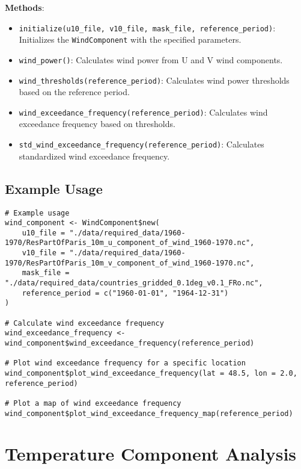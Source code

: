 \documentclass[a4paper,12pt]{article}
\begin{document}
\textbf{Methods}:

\begin{itemize}
    \item \texttt{initialize(u10\_file, v10\_file, mask\_file, reference\_period)}: Initializes the \texttt{WindComponent} with the specified parameters.
        
    \item \texttt{wind\_power()}: Calculates wind power from U and V wind components.
    
    \item \texttt{wind\_thresholds(reference\_period)}: Calculates wind power thresholds based on the reference period.
    
    \item \texttt{wind\_exceedance\_frequency(reference\_period)}: Calculates wind exceedance frequency based on thresholds.
    
    \item \texttt{std\_wind\_exceedance\_frequency(reference\_period)}: Calculates standardized wind exceedance frequency.
\end{itemize}

\subsection{Example Usage}

\begin{verbatim}
# Example usage
wind_component <- WindComponent$new(
    u10_file = "./data/required_data/1960-1970/ResPartOfParis_10m_u_component_of_wind_1960-1970.nc",
    v10_file = "./data/required_data/1960-1970/ResPartOfParis_10m_v_component_of_wind_1960-1970.nc",
    mask_file = "./data/required_data/countries_gridded_0.1deg_v0.1_FRo.nc",
    reference_period = c("1960-01-01", "1964-12-31")
)

# Calculate wind exceedance frequency
wind_exceedance_frequency <- wind_component$wind_exceedance_frequency(reference_period)

# Plot wind exceedance frequency for a specific location
wind_component$plot_wind_exceedance_frequency(lat = 48.5, lon = 2.0, reference_period)

# Plot a map of wind exceedance frequency
wind_component$plot_wind_exceedance_frequency_map(reference_period)
\end{verbatim}

\section{Temperature Component Analysis}
\label{sec:temperaturecomponent}
\end{document}
